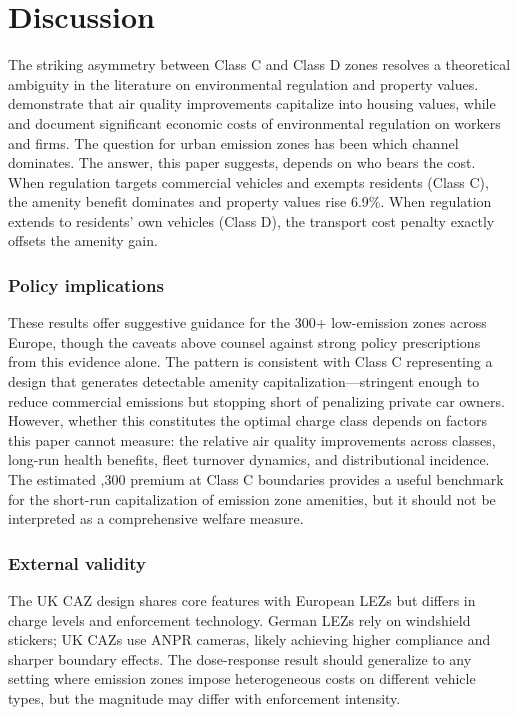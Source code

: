 \documentclass[12pt]{article}
\begin{document}
\section{Discussion}\label{sec:discussion}

The striking asymmetry between Class C and Class D zones resolves a theoretical ambiguity in the literature on environmental regulation and property values. \citet{chay2005} demonstrate that air quality improvements capitalize into housing values, while \citet{walker2013} and \citet{greenstone2005} document significant economic costs of environmental regulation on workers and firms. The question for urban emission zones has been which channel dominates. The answer, this paper suggests, depends on who bears the cost. When regulation targets commercial vehicles and exempts residents (Class C), the amenity benefit dominates and property values rise 6.9\%. When regulation extends to residents' own vehicles (Class D), the transport cost penalty exactly offsets the amenity gain.

\subsubsection*{Policy implications} These results offer suggestive guidance for the 300+ low-emission zones across Europe, though the caveats above counsel against strong policy prescriptions from this evidence alone. The pattern is consistent with Class C representing a design that generates detectable amenity capitalization---stringent enough to reduce commercial emissions but stopping short of penalizing private car owners. However, whether this constitutes the optimal charge class depends on factors this paper cannot measure: the relative air quality improvements across classes, long-run health benefits, fleet turnover dynamics, and distributional incidence. The estimated ,300 premium at Class C boundaries provides a useful benchmark for the short-run capitalization of emission zone amenities, but it should not be interpreted as a comprehensive welfare measure.

\subsubsection*{External validity} The UK CAZ design shares core features with European LEZs but differs in charge levels and enforcement technology. German LEZs rely on windshield stickers; UK CAZs use ANPR cameras, likely achieving higher compliance and sharper boundary effects. The dose-response result should generalize to any setting where emission zones impose heterogeneous costs on different vehicle types, but the magnitude may differ with enforcement intensity.
\end{document}
